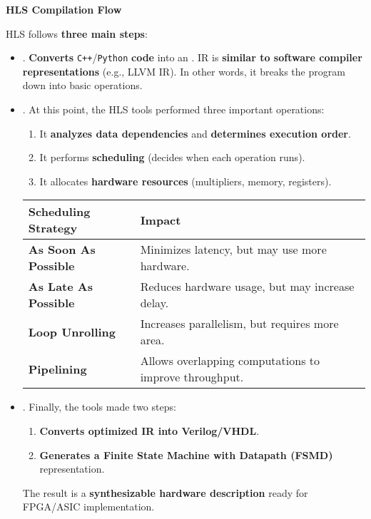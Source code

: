 \begin{flushleft}
    \textcolor{Green3}{ \textbf{HLS Compilation Flow}}
\end{flushleft}
HLS follows \textbf{three main steps}:
\begin{itemize}
    \item {}. \textbf{Converts} \texttt{C++}/\texttt{Python} \textbf{code} into an . IR is \textbf{similar to software compiler representations} (e.g., LLVM IR). In other words, it breaks the program down into basic operations.
    
    \item {}. At this point, the HLS tools performed three important operations:
    \begin{enumerate}
        \item It \textbf{analyzes data dependencies} and \textbf{determines execution order}.
        \item It performs \textbf{scheduling} (decides when each operation runs).
        \item It allocates \textbf{hardware resources} (multipliers, memory, registers).
    \end{enumerate}
    \begin{examplebox}
        \begin{center}
            \begin{tabular}{@{} l p{15em} @{}}
                \toprule
                \textbf{Scheduling Strategy} & \textbf{Impact} \\
                \midrule
                \textbf{As Soon As Possible} & Minimizes latency, but may use more hardware. \\ [.5em]
                \textbf{As Late As Possible} & Reduces hardware usage, but may increase delay. \\ [.5em]
                \textbf{Loop Unrolling}      & Increases parallelism, but requires more area. \\ [.5em]
                \textbf{Pipelining}          & Allows overlapping computations to improve throughput. \\
                \bottomrule
            \end{tabular}
        \end{center}
    \end{examplebox}

    \item {}. Finally, the tools made two steps:
    \begin{enumerate}
        \item \textbf{Converts optimized IR into Verilog/VHDL}.
        \item \textbf{Generates a Finite State Machine with Datapath (FSMD)} representation.
    \end{enumerate}
    The result is a \textbf{synthesizable hardware description} ready for FPGA/ASIC implementation.


\end{itemize}
